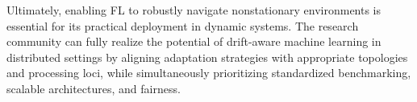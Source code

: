 \documentclass[journal]{IEEEtran}
\begin{document}
Ultimately, enabling FL to robustly navigate nonstationary environments is essential for its practical deployment in dynamic systems. The research community can fully realize the potential of drift-aware machine learning in distributed settings by aligning adaptation strategies with appropriate topologies and processing loci, while simultaneously prioritizing standardized benchmarking, scalable architectures, and fairness.



\end{document}
